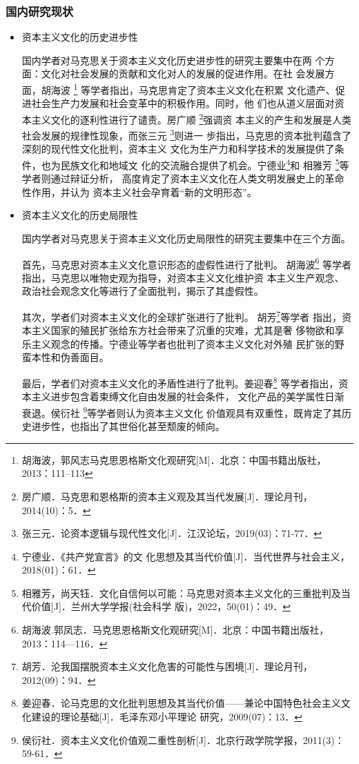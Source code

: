 \documentclass[a4paper]{ctexart}
\begin{document}
\subsubsection{国内研究现状}
\begin{itemize}
    \item {\heiti 资本主义文化的历史进步性}

    \qquad 国内学者对马克思关于资本主义文化历史进步性的研究主要集中在两
    个方面：文化对社会发展的贡献和文化对人的发展的促进作用。在社
    会发展方面，胡海波 \footnote{胡海波，郭风志马克思恩格斯文化观研究[M]．北京：中国书籍出版社，2013：111--113}
    等学者指出，马克思肯定了资本主义文化在积累
    文化遗产、促进社会生产力发展和社会变革中的积极作用。同时，他
    们也从道义层面对资本主义文化的逐利性进行了谴责。房广顺
    \footnote{房广顺．马克思和恩格斯的资本主义观及其当代发展[J]．理论月刊，2014(10)：5．}强调资
    本主义的产生和发展是人类社会发展的规律性现象，而张三元
    \footnote{张三元．论资本逻辑与现代性文化[J]．江汉论坛，2019(03)：71-77．
    }则进一
    步指出，马克思的资本批判蕴含了深刻的现代性文化批判，资本主义
    文化为生产力和科学技术的发展提供了条件，也为民族文化和地域文
    化的交流融合提供了机会。宁德业\footnote{宁德业．《共产党宣言》的文
    化思想及其当代价值[J]．当代世界与社会主义，2018(01)：61．}和
    相雅芳
    \footnote{相雅芳，尚天钰．文化自信何以可能：马克思对资本主义文化的三重批判及当代价值[J]．兰州大学学报(社会科学 版)，2022，50(01)：49．
    }等学者则通过辩证分析，
    高度肯定了资本主义文化在人类文明发展史上的革命性作用，并认为
    资本主义社会孕育着“新的文明形态”。
    \item {\heiti 资本主义文化的历史局限性}
    
    \qquad 国内学者对马克思关于资本主义文化历史局限性的研究主要集中在三个方面。

    \qquad 首先，马克思对资本主义文化意识形态的虚假性进行了批判。
    胡海波\footnote{胡海波.郭凤志．马克思恩格斯文化观研究[M]．北京：中国书籍出版社，2013：114—116．
    }
    等学者指出，马克思以唯物史观为指导，对资本主义文化维护资
    本主义生产观念、政治社会观念文化等进行了全面批判，揭示了其虚假性。
    
    \qquad 其次，学者们对资本主义文化的全球扩张进行了批判。
    胡芳\footnote{胡芳．沦我国摆脱资本主义文化危害的可能性与困境[J]．理论月刊，2012(09)：94．
    }等学者
    指出，资本主义国家的殖民扩张给东方社会带来了沉重的灾难，尤其是奢
    侈物欲和享乐主义观念的传播。宁德业等学者也批判了资本主义文化对外殖
    民扩张的野蛮本性和伪善面目。

    \qquad 最后，学者们对资本主义文化的矛盾性进行了批判。姜迎春\footnote{姜迎春．论马克思的文化批判思想及其当代价值——兼论中国特色社会主义文化建设的理论基础[J]．毛泽东邓小平理论 研究，2009(07)：13．}
    等学者指出，资本主义进步包含着束缚文化自由发展的社会条件，
    文化产品的美学属性日渐衰退。侯衍社
    \footnote{侯衍社．资本主义文化价值观二重性剖析[J]．北京行政学院学报，2011(3)：59-61．
    }等学者则认为资本主义文化
    价值观具有双重性，既肯定了其历史进步性，也指出了其世俗化甚至颓废的倾向。
\end{itemize}
\end{document}

